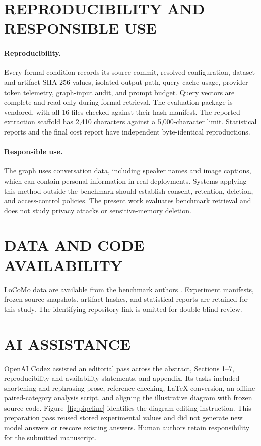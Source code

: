 \documentclass[a4paper,twoside]{article}
\begin{document}
\section*{\uppercase{Reproducibility and Responsible Use}}

\paragraph{Reproducibility.}
Every formal condition records its source commit, resolved configuration,
dataset and artifact SHA-256 values, isolated output path, query-cache usage,
provider-token telemetry, graph-input audit, and prompt budget. Query vectors
are complete and read-only during formal retrieval. The evaluation package is
vendored, with all 16 files checked against their hash manifest. The
reported extraction scaffold has 2,410 characters against a 5,000-character
limit. Statistical reports and the final cost report have
independent byte-identical reproductions.

\paragraph{Responsible use.}
The graph uses conversation data, including speaker names and image captions,
which can contain personal information in real deployments. Systems applying
this method outside the benchmark should establish consent, retention,
deletion, and access-control policies. The present work evaluates benchmark
retrieval and does not study privacy attacks or sensitive-memory deletion.

\section*{\uppercase{Data and Code Availability}}

LoCoMo data are available from the benchmark authors
\cite{maharana2024locomo}. Experiment manifests, frozen source snapshots,
artifact hashes, and statistical reports are retained for this study.
The identifying repository link is omitted for double-blind review.

\section*{\uppercase{AI Assistance}}
\label{sec:ai}
OpenAI Codex \cite{openai2026codex} assisted an editorial pass across the
abstract, Sections 1--7, reproducibility and availability statements, and
appendix. Its tasks included shortening and rephrasing prose, reference
checking, \LaTeX{} conversion, an offline paired-category analysis script,
and aligning the illustrative diagram with frozen source code. Figure~\ref{fig:pipeline} identifies the diagram-editing
instruction. This preparation pass reused stored experimental values and did
not generate new model answers or rescore existing answers. Human authors retain
responsibility for the submitted manuscript.
\end{document}

